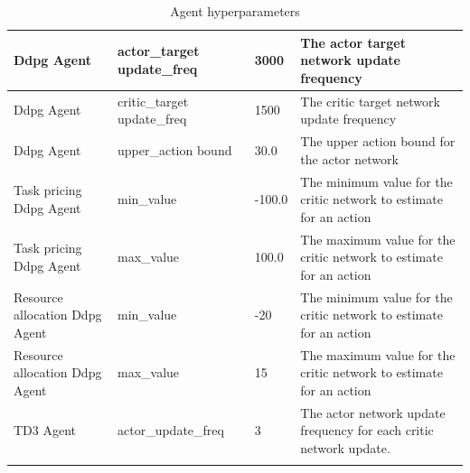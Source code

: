 \begin{longtable}{|p{2cm}|p{3.5cm}|p{2.5cm}|p{6cm}|}
        Ddpg Agent & actor\_target update\_freq & 3000 & The actor target network update frequency \\ \hline
        Ddpg Agent & critic\_target update\_freq & 1500 & The critic target network update frequency \\ \hline
        Ddpg Agent & upper\_action bound & 30.0 & The upper action bound for the actor network \\ \hline
        Task pricing Ddpg Agent & min\_value & -100.0 & The minimum value for the critic network to estimate for an
            action \\ \hline
        Task pricing Ddpg Agent & max\_value & 100.0 & The maximum value for the critic network to estimate for an
            action\\ \hline
        Resource allocation Ddpg Agent & min\_value & -20 & The minimum value for the critic network to estimate for an
            action \\ \hline
        Resource allocation Ddpg Agent & max\_value & 15 & The maximum value for the critic network to estimate for an
            action\\ \hline
        TD3 Agent & actor\_update\_freq & 3 & The actor network update frequency for each critic network update. \\ \hline
    \caption{Agent hyperparameters}
    \label{tab:agent_hyperparameters}
\end{longtable}


